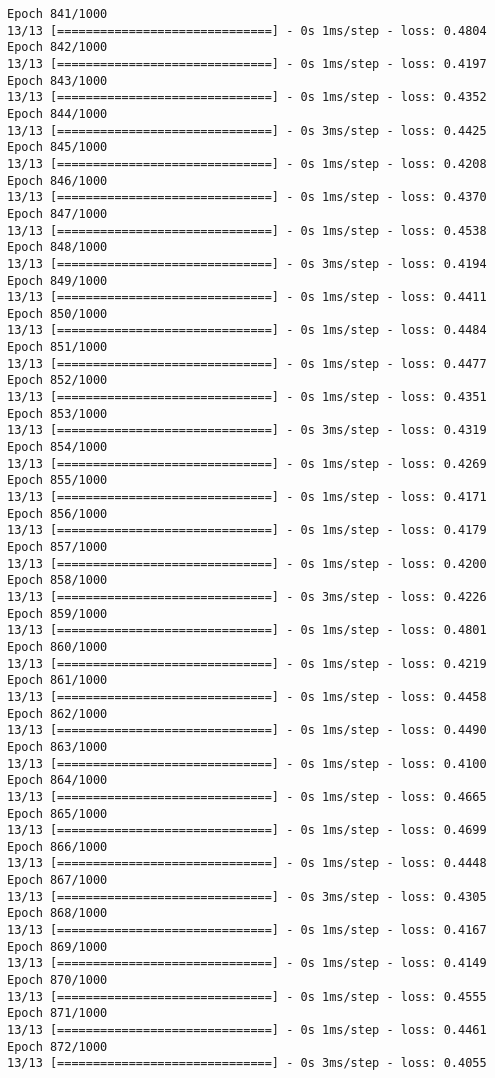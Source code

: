 \documentclass[11pt]{article}
\begin{document}
\begin{Verbatim}[commandchars=\\\{\}]
Epoch 841/1000
13/13 [==============================] - 0s 1ms/step - loss: 0.4804
Epoch 842/1000
13/13 [==============================] - 0s 1ms/step - loss: 0.4197
Epoch 843/1000
13/13 [==============================] - 0s 1ms/step - loss: 0.4352
Epoch 844/1000
13/13 [==============================] - 0s 3ms/step - loss: 0.4425
Epoch 845/1000
13/13 [==============================] - 0s 1ms/step - loss: 0.4208
Epoch 846/1000
13/13 [==============================] - 0s 1ms/step - loss: 0.4370
Epoch 847/1000
13/13 [==============================] - 0s 1ms/step - loss: 0.4538
Epoch 848/1000
13/13 [==============================] - 0s 3ms/step - loss: 0.4194
Epoch 849/1000
13/13 [==============================] - 0s 1ms/step - loss: 0.4411
Epoch 850/1000
13/13 [==============================] - 0s 1ms/step - loss: 0.4484
Epoch 851/1000
13/13 [==============================] - 0s 1ms/step - loss: 0.4477
Epoch 852/1000
13/13 [==============================] - 0s 1ms/step - loss: 0.4351
Epoch 853/1000
13/13 [==============================] - 0s 3ms/step - loss: 0.4319
Epoch 854/1000
13/13 [==============================] - 0s 1ms/step - loss: 0.4269
Epoch 855/1000
13/13 [==============================] - 0s 1ms/step - loss: 0.4171
Epoch 856/1000
13/13 [==============================] - 0s 1ms/step - loss: 0.4179
Epoch 857/1000
13/13 [==============================] - 0s 1ms/step - loss: 0.4200
Epoch 858/1000
13/13 [==============================] - 0s 3ms/step - loss: 0.4226
Epoch 859/1000
13/13 [==============================] - 0s 1ms/step - loss: 0.4801
Epoch 860/1000
13/13 [==============================] - 0s 1ms/step - loss: 0.4219
Epoch 861/1000
13/13 [==============================] - 0s 1ms/step - loss: 0.4458
Epoch 862/1000
13/13 [==============================] - 0s 1ms/step - loss: 0.4490
Epoch 863/1000
13/13 [==============================] - 0s 1ms/step - loss: 0.4100
Epoch 864/1000
13/13 [==============================] - 0s 1ms/step - loss: 0.4665
Epoch 865/1000
13/13 [==============================] - 0s 1ms/step - loss: 0.4699
Epoch 866/1000
13/13 [==============================] - 0s 1ms/step - loss: 0.4448
Epoch 867/1000
13/13 [==============================] - 0s 3ms/step - loss: 0.4305
Epoch 868/1000
13/13 [==============================] - 0s 1ms/step - loss: 0.4167
Epoch 869/1000
13/13 [==============================] - 0s 1ms/step - loss: 0.4149
Epoch 870/1000
13/13 [==============================] - 0s 1ms/step - loss: 0.4555
Epoch 871/1000
13/13 [==============================] - 0s 1ms/step - loss: 0.4461
Epoch 872/1000
13/13 [==============================] - 0s 3ms/step - loss: 0.4055

\end{Verbatim}
\end{document}
